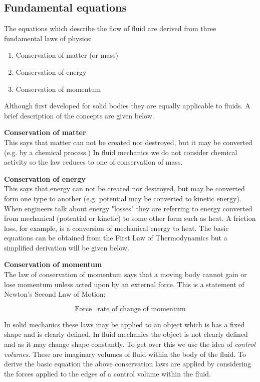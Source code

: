 \documentclass[a4paper, 12pt, british]{article} %
\numberwithin{equation}{section}
\numberwithin{figure}{section}
\numberwithin{table}{section}
\begin{document}
\subsection{Fundamental equations}

The equations which describe the flow of fluid are derived from three fundamental laws of physics:

\begin{enumerate}
	\item Conservation of matter (or mass)
\item Conservation of energy 
\item Conservation of momentum
\end{enumerate}

Although first developed for solid bodies they are equally applicable to fluids. A brief description of the concepts are given below.

\textbf{Conservation of matter}\\
This says that matter can not be created nor destroyed, but it may be converted (e.g. by a chemical process.) In fluid mechanics we do not consider chemical activity so the law reduces to one of conservation of mass.

\textbf{Conservation of energy}\\
This says that energy can not be created nor destroyed, but may be converted form one type to another (e.g. potential may be converted to kinetic energy). When engineers talk about energy "losses" they are referring to energy converted from mechanical (potential or kinetic) to some other form such as heat. A friction loss, for example, is a conversion of mechanical energy to heat. The basic equations can be obtained from the First Law of Thermodynamics but a simplified derivation will be given below.



\textbf{Conservation of momentum}\\
The law of conservation of momentum says that a moving body cannot gain or lose momentum unless acted upon by an external force. This is a statement of Newton's Second Law of Motion:

\begin{equation*}
\text{Force} = \text{rate of change of momentum}
\end{equation*}

In solid mechanics these laws may be applied to an object which is has a fixed shape and is clearly defined. In fluid mechanics the object is not clearly defined and as it may change shape constantly. To get over this we use the idea of  \textit{control volumes}. These are imaginary volumes of fluid within the body of the fluid. To derive the basic equation the above conservation laws are applied by considering the forces applied to the edges of a control volume within the fluid.
\end{document}
